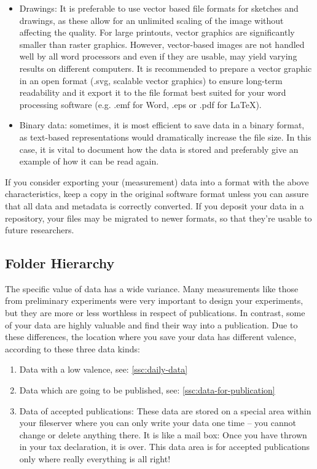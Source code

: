 \begin{itemize}
  \item Drawings: It is preferable to use vector based file formats for sketches
        and drawings, as these allow for an unlimited scaling of the image
        without affecting the quality. For large printouts, vector graphics are
        significantly smaller than raster graphics. However, vector-based images
        are not handled well by all word processors and even if they are usable,
        may yield varying results on different computers. It is recommended to
        prepare a vector graphic in an open format (.svg, scalable vector
        graphics) to ensure long-term readability and it export it to the file
        format best suited for your word processing software (e.g. .emf for
        Word, .eps or .pdf for LaTeX).
  \item Binary data: sometimes, it is most efficient to save data in a binary
        format, as text-based representations would dramatically increase the
        file size. In this case, it is vital to document how the data is stored
        and preferably give an example of how it can be read again.
\end{itemize}

\noindent If you consider exporting your (measurement) data into a format
with the above characteristics, keep a copy in the original software format
unless you can assure that all data and metadata is correctly converted. If you
deposit your data in a repository, your files may be migrated to newer formats,
so that they’re usable to future researchers.

\subsection{Folder Hierarchy}

The specific value of data has a wide variance. Many measurements like those
from preliminary experiments were very important to design your experiments,
but they are more or less worthless in respect of publications. In contrast,
some of your data are highly valuable and find their way into a publication.
Due to these differences, the location where you save your data has different
valence, according to these three data kinds:
\begin{enumerate}[label=\Roman*.]
  \item Data with a low valence, see:
       \ref{ssc:daily-data} 
  \item Data which are going to be published, see:
        \ref{ssc:data-for-publication} 
  \item Data of accepted publications: These data are stored on a special area
        within your fileserver where you can only write your data one time – you
        cannot change or delete anything there. It is like a mail box: Once you
        have thrown in your tax declaration, it is over. This data area is for
        accepted publications only where really everything is all right!
\end{enumerate}

